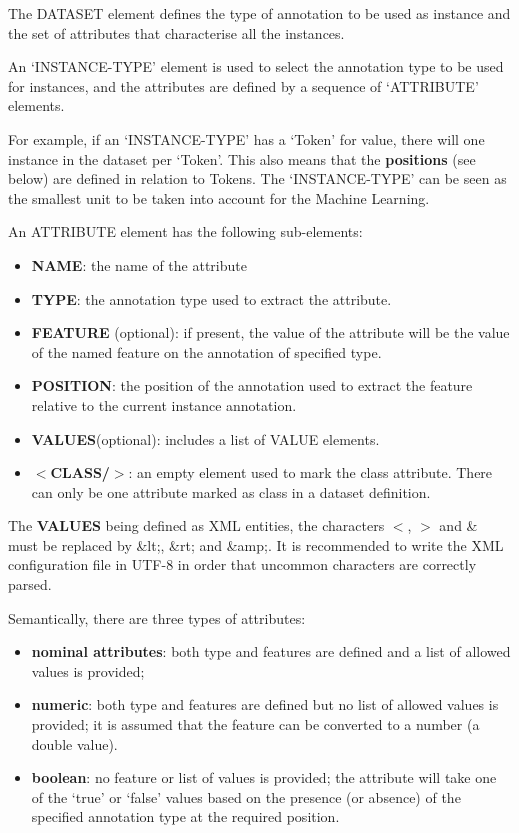 
The DATASET element defines the type of annotation to be used as
instance and the set of attributes that characterise all the instances.

An `INSTANCE-TYPE' element is used to select the annotation type to be
used for instances, and the attributes are defined by a sequence of
`ATTRIBUTE' elements.

For example, if an `INSTANCE-TYPE' has a `Token' for value, there will one
instance in the dataset per `Token'. This also means that the \textbf{positions}
(see below) are defined in relation to Tokens. The `INSTANCE-TYPE' can be seen
as the smallest unit to be taken into account for the Machine Learning.

An ATTRIBUTE element has the following sub-elements:
\begin{itemize}
\item \textbf{NAME}: the name of the attribute
\item \textbf{TYPE}: the annotation type used to extract the attribute.
\item \textbf{FEATURE} (optional): if present, the value of the
attribute will be the value of the named feature on the
annotation of specified type.
\item \textbf{POSITION}: the position of the annotation used to
extract the feature relative to the current instance annotation.
\item \textbf{VALUES}(optional): includes a list of VALUE elements.
\item \textbf{$<$CLASS/$>$}: an empty element used to mark the class
attribute. There can only be one attribute marked as class in a
dataset definition.
\end{itemize}
The \textbf{VALUES} being defined as XML entities, the characters $<$, $>$
and \& must be replaced by \&lt;, \&rt; and \&amp;. It is recommended to write
the XML configuration file in UTF-8 in order that uncommon characters are
correctly parsed.

Semantically, there are three types of attributes:
\begin{itemize}
\item \textbf{nominal attributes}: both type and features are defined
and a list of allowed values is provided;
\item \textbf{numeric}: both type and features are defined but no list
of allowed values is provided; it is assumed that the feature can be
converted to a number (a double value).
\item \textbf{boolean}: no feature or list of values is provided; the
attribute will take one of the `true' or `false' values based on the
presence (or absence) of the specified annotation type at the
required position.
\end{itemize}

